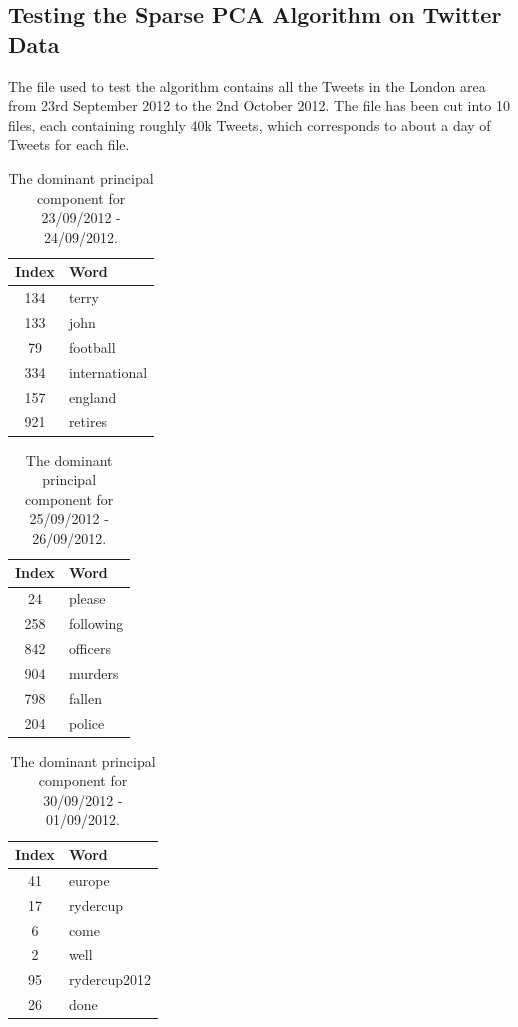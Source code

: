 \documentclass[11pt,a4paper]{article}
\begin{document}
\subsection{Testing the Sparse PCA Algorithm on Twitter Data}
The file used to test the algorithm contains all the Tweets in the London area from 23rd September 2012 to the 2nd October 2012. 
The file has been cut into 10 files, each containing roughly 40k Tweets, which corresponds to about a day of Tweets for each file.

\begin{table}[H]
\center
\begin{tabular}{| c l |}
\hline
Index & Word \\
\hline
134 & terry\\
133 & john\\
79 & football\\
334 & international\\
157 & england\\
921 & retires\\
\hline
\end{tabular}
\caption{The dominant principal component for 23/09/2012 - 24/09/2012.}
\label{john_terry}
\end{table}

\begin{table}[H]
\center
\begin{tabular}{| c l |}
\hline
Index & Word \\
\hline
24 & please\\
258 & following\\
842 & officers\\
904 & murders\\
798 & fallen\\
204 & police\\
\hline
\end{tabular}
\caption{The dominant principal component for 25/09/2012 - 26/09/2012.}
\label{murder}
\end{table}

\begin{table}[H]
\center
\begin{tabular}{| c l |}
\hline
Index & Word \\
\hline
41 & europe\\
17 & rydercup\\
6 & come\\
2 & well\\
95 & rydercup2012\\
26 & done\\
\hline
\end{tabular}
\caption{The dominant principal component for 30/09/2012 - 01/09/2012.}
\label{ryder_cup}
\end{table}
\end{document}
